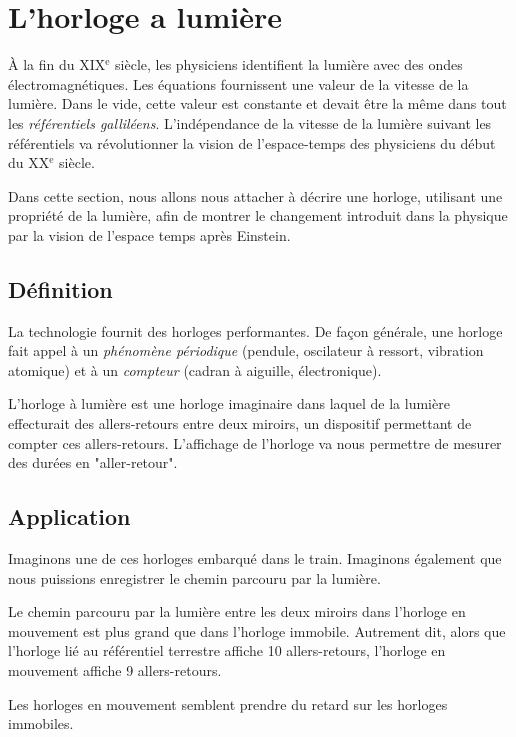 
\section{L'horloge a lumière}

À la fin du {\footnotesize XIX}$^\text{e}$ siècle, les physiciens identifient la lumière avec des ondes électromagnétiques. Les équations fournissent une valeur de la vitesse de la lumière. Dans le vide, cette valeur est constante et devait être la même dans tout les {\it référentiels galliléens}. L'indépendance de la vitesse de la lumière suivant les référentiels va révolutionner la vision de l'espace-temps des physiciens du début du {\footnotesize XX}$^\text{e}$ siècle.

Dans cette section, nous allons nous attacher à décrire une horloge, utilisant une propriété de la lumière, afin de montrer le changement introduit dans la physique par la vision de l'espace temps après Einstein.

\subsection{Définition}

La technologie fournit des horloges performantes. De façon générale, une horloge fait appel à un {\it phénomène périodique} (pendule, oscilateur à ressort, vibration atomique) et à un {\it compteur} (cadran à aiguille, électronique).

L'horloge à lumière est une horloge imaginaire dans laquel de la lumière effecturait des allers-retours entre deux miroirs, un dispositif permettant de compter ces allers-retours. L'affichage de l'horloge va nous permettre de mesurer des durées en "aller-retour".


\subsection{Application}

Imaginons une de ces horloges embarqué dans le train. Imaginons également que nous puissions enregistrer le chemin parcouru par la lumière.

Le chemin parcouru par la lumière entre les deux miroirs dans l'horloge en mouvement est plus grand que dans l'horloge immobile. Autrement dit, alors que l'horloge lié au référentiel terrestre affiche 10 allers-retours, l'horloge en mouvement affiche 9 allers-retours.

Les horloges en mouvement semblent prendre du retard sur les horloges immobiles. 

